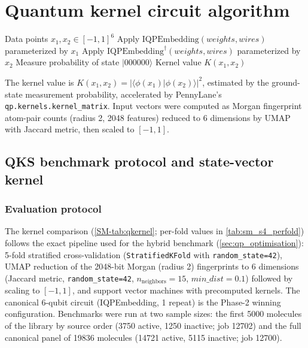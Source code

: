 \documentclass[11pt,a4paper]{article}
\begin{document}

\section{Quantum kernel circuit algorithm}
\label{sec:qkernel_algorithm}

\begin{algorithm}[htbp]
\caption{Quantum kernel circuit for 6-qubit state overlap using PennyLane's \texttt{IQPEmbedding} template.}
\label{SM-alg:qkernel}
\begin{algorithmic}[1]
\REQUIRE Data points $x_1, x_2 \in [-1, 1]^6$
\STATE Apply $\mathrm{IQPEmbedding}(weights, wires)$ parameterized by $x_1$
\STATE Apply $\mathrm{IQPEmbedding}^\dagger(weights, wires)$ parameterized by $x_2$
\STATE Measure probability of state $|000000\rangle$
\RETURN Kernel value $K(x_1, x_2)$
\end{algorithmic}
\end{algorithm}

The kernel value is $K(x_1, x_2) = |\langle \phi(x_1) | \phi(x_2) \rangle|^2$, estimated by the ground-state measurement probability, accelerated by PennyLane's \texttt{qp.kernels.kernel\_matrix}. Input vectors were computed as Morgan fingerprint atom-pair counts (radius 2, \num{2048} features) reduced to 6 dimensions by UMAP with Jaccard metric, then scaled to $[-1, 1]$.

\subsection{QKS benchmark protocol and state-vector kernel}
\label{sec:qks_benchmark}

\subsubsection{Evaluation protocol}
The kernel comparison (\cref{SM-tab:qkernel}; per-fold values in \cref{tab:sm_s4_perfold}) follows the exact pipeline used for the hybrid benchmark (\cref{sec:qp_optimisation}): 5-fold stratified cross-validation (\texttt{StratifiedKFold} with \texttt{random\_state=42}), UMAP reduction of the 2048-bit Morgan (radius 2) fingerprints to 6 dimensions (Jaccard metric, \texttt{random\_state=42}, $n_{\text{neighbors}}=15$, $min\_dist=0.1$) followed by scaling to $[-1,1]$, and support vector machines with precomputed kernels. The canonical 6-qubit circuit (IQPEmbedding, 1 repeat) is the Phase-2 winning configuration. Benchmarks were run at two sample sizes: the first \num{5000} molecules of the library by source order (\num{3750} active, \num{1250} inactive; job 12702) and the full canonical panel of \num{19836} molecules (\num{14721} active, \num{5115} inactive; job 12700).
\end{document}
